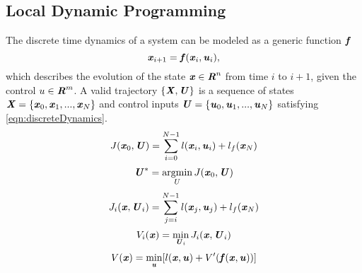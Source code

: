 \subsection{Local Dynamic Programming}
The discrete time dynamics of a system can be modeled as a generic function $\bm{\mathit{f}}$
\begin{equation}\label{eqn:discreteDynamics}
\bm{\mathit{x}}_{i+1}=\bm{\mathit{f}}(\bm{\mathit{x}}_i,\bm{\mathit{u}}_i), 
\end{equation}
which describes the evolution of the state $\bm{\mathit{x}}\in \bm{\mathit{R}}^n$ from time $i$ to $i+1$, given the control $u\in \bm{\mathit{R}}^m$. A valid trajectory $\{\bm{\mathit{X}}, \bm{\mathit{U}}\}$ is a sequence of states $\bm{\mathit{X}}=\{\bm{\mathit{x}}_0, \bm{\mathit{x}}_1, ..., \bm{\mathit{x}}_N\}$ and control inputs $\bm{\mathit{U}}=\{\bm{\mathit{u}}_0, \bm{\mathit{u}}_1, ..., \bm{\mathit{u}}_N\}$ satisfying \cref{eqn:discreteDynamics}.
\begin{equation}\label{eqn:totalCost}
J(\bm{\mathit{x}}_0, \bm{\mathit{U}})=\sum_{i=0}^{N-1}l(\bm{\mathit{x}}_i,\bm{\mathit{u}}_i)+l_f(\bm{\mathit{x}}_N)
\end{equation}
\begin{equation}\label{eqn:minControl}
\bm{\mathit{U}}^*=\operatorname*{argmin}_U J(\bm{\mathit{x}}_0, \bm{\mathit{U}})
\end{equation}
\begin{equation}\label{costToGo}
J_i(\bm{\mathit{x}}, \bm{\mathit{U}}_i)=\sum_{j=i}^{N-1}l(\bm{\mathit{x}}_j,\bm{\mathit{u}}_j)+l_f(\bm{\mathit{x}}_N)
\end{equation}
\begin{equation}\label{eqn:value}
V_i(\bm{\mathit{x}})=\min_{\bm{\mathit{U}}_i}J_i(\bm{\mathit{x}}, \bm{\mathit{U}}_i)
\end{equation}
\begin{equation}
V(\bm{\mathit{x}})=\min_{\bm{\mathit{u}}}[l(\bm{\mathit{x}}, \bm{\mathit{u}})+V'(\bm{\mathit{f}}(\bm{\mathit{x}},\bm{\mathit{u}}))]
\end{equation}
